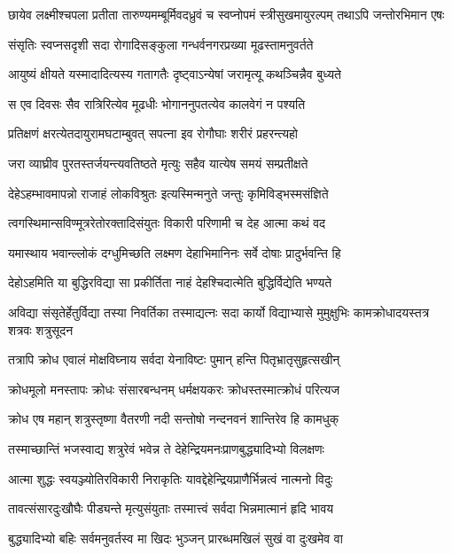 \fourlineindentedshloka
{छायेव लक्ष्मीश्चपला प्रतीता}
{तारुण्यमम्बूर्मिवदध्रुवं च}
{स्वप्नोपमं स्त्रीसुखमायुरल्पम्}
{तथाऽपि जन्तोरभिमान एषः} %

\twolineshloka
{संसृतिः स्वप्नसदृशी सदा रोगादिसङ्कुला}
{गन्धर्वनगरप्रख्या मूढस्तामनुवर्तते} %

\twolineshloka
{आयुष्यं क्षीयते यस्मादादित्यस्य गतागतैः}
{दृष्ट्वाऽन्येषां जरामृत्यू कथञ्चिन्नैव बुध्यते} %

\twolineshloka
{स एव दिवसः सैव रात्रिरित्येव मूढधीः}
{भोगाननुपतत्येव कालवेगं न पश्यति} %

\twolineshloka
{प्रतिक्षणं क्षरत्येतदायुरामघटाम्बुवत्}
{सपत्ना इव रोगौघाः शरीरं प्रहरन्त्यहो} %

\twolineshloka
{जरा व्याघ्रीव पुरतस्तर्जयन्त्यवतिष्ठते}
{मृत्युः सहैव यात्येष समयं सम्प्रतीक्षते} %

\twolineshloka
{देहेऽहम्भावमापन्नो राजाहं लोकविश्रुतः}
{इत्यस्मिन्मनुते जन्तुः कृमिविड्भस्मसंज्ञिते} %

\twolineshloka
{त्वगस्थिमान्सविण्मूत्ररेतोरक्तादिसंयुतः}
{विकारी परिणामी च देह आत्मा कथं वद} %

\twolineshloka
{यमास्थाय भवान्ल्लोकं दग्धुमिच्छति लक्ष्मण}
{देहाभिमानिनः सर्वे दोषाः प्रादुर्भवन्ति हि} %

\twolineshloka
{देहोऽहमिति या बुद्धिरविद्या सा प्रकीर्तिता}
{नाहं देहश्चिदात्मेति बुद्धिर्विद्येति भण्यते} %

\threelineshloka
{अविद्या संसृतेर्हेतुर्विद्या तस्या निवर्तिका}
{तस्माद्यत्नः सदा कार्यो विद्याभ्यासे मुमुक्षुभिः}
{कामक्रोधादयस्तत्र शत्रवः शत्रुसूदन} %

\twolineshloka
{तत्रापि क्रोध एवालं मोक्षविघ्नाय सर्वदा}
{येनाविष्टः पुमान् हन्ति पितृभ्रातृसुहृत्सखीन्} %

\twolineshloka
{क्रोधमूलो मनस्तापः क्रोधः संसारबन्धनम्}
{धर्मक्षयकरः क्रोधस्तस्मात्क्रोधं परित्यज} %

\twolineshloka
{क्रोध एष महान् शत्रुस्तृष्णा वैतरणी नदी}
{सन्तोषो नन्दनवनं शान्तिरेव हि कामधुक्} %

\twolineshloka
{तस्माच्छान्तिं भजस्वाद्य शत्रुरेवं भवेन्न ते}
{देहेन्द्रियमनःप्राणबुद्ध्यादिभ्यो विलक्षणः} %

\twolineshloka
{आत्मा शुद्धः स्वयञ्ज्योतिरविकारी निराकृतिः}
{यावद्देहेन्द्रियप्राणैर्भिन्नत्वं नात्मनो विदुः} %

\twolineshloka
{तावत्संसारदुःखौघैः पीड्यन्ते मृत्युसंयुताः}
{तस्मात्त्वं सर्वदा भिन्नमात्मानं हृदि भावय} %

\twolineshloka
{बुद्ध्यादिभ्यो बहिः सर्वमनुवर्तस्व मा खिदः}
{भुञ्जन् प्रारब्धमखिलं सुखं वा दुःखमेव वा} %

